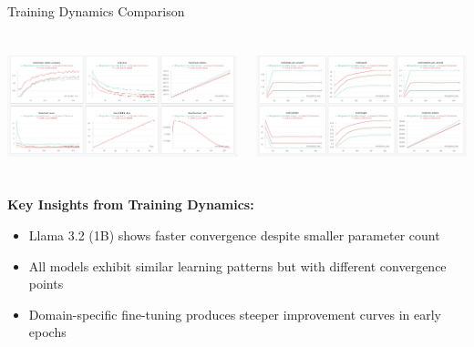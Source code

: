 \begin{frame}{Training Dynamics Comparison}
  \begin{columns}
    \begin{column}{0.48\textwidth}
      \begin{minipage}{\textwidth}
        \includegraphics[width=\textwidth, height=3.5cm]{presentation/images/wandb/train.png}
      \end{minipage}
    \end{column}
    \begin{column}{0.48\textwidth}
      \begin{minipage}{\textwidth}
        \includegraphics[width=\textwidth, height=3.5cm]{presentation/images/wandb/eval.png}
      \end{minipage}
    \end{column}
    
      
  \end{columns}
  
  \vspace{0.2cm}
  \footnotesize
  \textbf{Key Insights from Training Dynamics:}
  \begin{itemize}
    \item Llama 3.2 (1B) shows faster convergence despite smaller parameter count
    \item All models exhibit similar learning patterns but with different convergence points
    \item Domain-specific fine-tuning produces steeper improvement curves in early epochs
  \end{itemize}
\end{frame}


